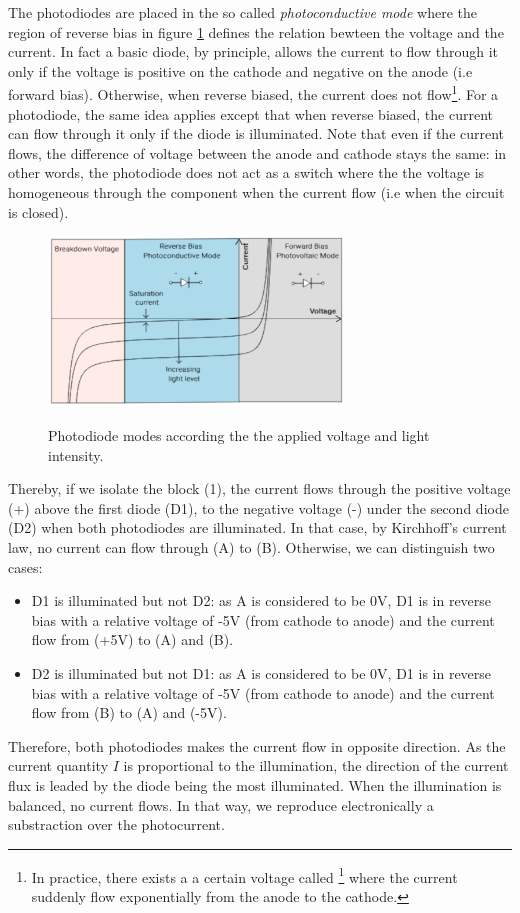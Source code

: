 \documentclass[11pt]{report}
\begin{document}
The photodiodes are placed in the so called \textit{photoconductive mode} where the region of reverse bias in figure \ref{fig:photodiode-vi} defines the relation bewteen the voltage and the current. In fact a basic diode, by principle, allows the current to flow through it only if the voltage is positive on the cathode and negative on the anode (i.e forward bias). Otherwise, when reverse biased, the current does not flow\footnote{In practice, there exists a a certain voltage called \footnote{breakdown voltage} where the current suddenly flow exponentially from the anode to the cathode.}. For a photodiode, the same idea applies except that when reverse biased, the current can flow through it only if the diode is illuminated. Note that even if the current flows, the difference of voltage between the anode and cathode stays the same: in other words, the photodiode does not act as a switch where the the voltage is homogeneous through the component when the current flow (i.e when the circuit is closed). 

\begin{figure}[h!]
\caption{Photodiode modes according the the applied voltage and light intensity.}
\centering
\includegraphics[width=0.7\textwidth]{photodiode-vi}
\label{fig:photodiode-vi}
\end{figure}

Thereby, if we isolate the block (1), the current flows through the positive voltage (+) above the first diode (D1), to the negative voltage (-) under the second diode (D2) when both photodiodes are illuminated. In that case, by Kirchhoff's current law, no current can flow through (A) to (B). Otherwise, we can distinguish two cases:
\begin{itemize}
 \item D1 is illuminated but not D2: as A is considered to be 0V, D1 is in reverse bias with a relative voltage of -5V (from cathode to anode) and the current flow from (+5V) to (A) and (B).
 \item D2 is illuminated but not D1: as A is considered to be 0V, D1 is in reverse bias with a relative voltage of -5V (from cathode to anode) and the current flow from (B) to (A) and (-5V).
\end{itemize}
Therefore, both photodiodes makes the current flow in opposite direction. As the current quantity $I$ is proportional to the illumination, the direction of the current flux is leaded by the diode being the most illuminated. When the illumination is balanced, no current flows. In that way, we reproduce electronically a substraction over the photocurrent.
\end{document}
